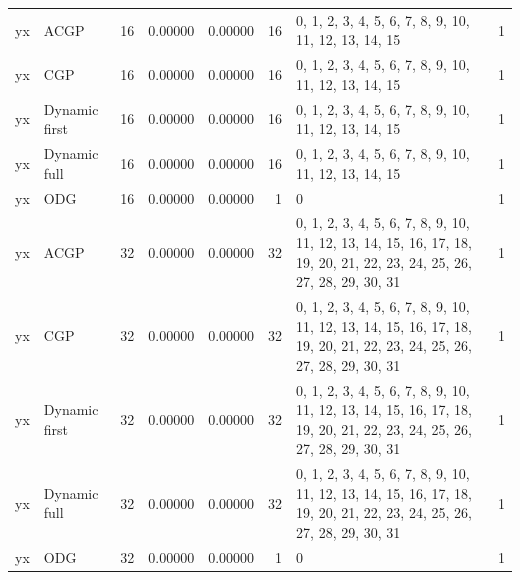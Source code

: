 \documentclass[10pt,a4paper]{article}
\begin{document}
\begin{longtable}{@{}p{23mm}p{29mm}rrrrp{36mm}r@{}}
yx & ACGP & 16 & 0.00000 & 0.00000 & 16 & 0, 1, 2, 3, 4, 5, 6, 7, 8, 9, 10, 11, 12, 13, 14, 15 & 1 \\
yx & CGP & 16 & 0.00000 & 0.00000 & 16 & 0, 1, 2, 3, 4, 5, 6, 7, 8, 9, 10, 11, 12, 13, 14, 15 & 1 \\
yx & Dynamic first & 16 & 0.00000 & 0.00000 & 16 & 0, 1, 2, 3, 4, 5, 6, 7, 8, 9, 10, 11, 12, 13, 14, 15 & 1 \\
yx & Dynamic full & 16 & 0.00000 & 0.00000 & 16 & 0, 1, 2, 3, 4, 5, 6, 7, 8, 9, 10, 11, 12, 13, 14, 15 & 1 \\
yx & ODG & 16 & 0.00000 & 0.00000 & 1 & 0 & 1 \\
yx & ACGP & 32 & 0.00000 & 0.00000 & 32 & 0, 1, 2, 3, 4, 5, 6, 7, 8, 9, 10, 11, 12, 13, 14, 15, 16, 17, 18, 19, 20, 21, 22, 23, 24, 25, 26, 27, 28, 29, 30, 31 & 1 \\
yx & CGP & 32 & 0.00000 & 0.00000 & 32 & 0, 1, 2, 3, 4, 5, 6, 7, 8, 9, 10, 11, 12, 13, 14, 15, 16, 17, 18, 19, 20, 21, 22, 23, 24, 25, 26, 27, 28, 29, 30, 31 & 1 \\
yx & Dynamic first & 32 & 0.00000 & 0.00000 & 32 & 0, 1, 2, 3, 4, 5, 6, 7, 8, 9, 10, 11, 12, 13, 14, 15, 16, 17, 18, 19, 20, 21, 22, 23, 24, 25, 26, 27, 28, 29, 30, 31 & 1 \\
yx & Dynamic full & 32 & 0.00000 & 0.00000 & 32 & 0, 1, 2, 3, 4, 5, 6, 7, 8, 9, 10, 11, 12, 13, 14, 15, 16, 17, 18, 19, 20, 21, 22, 23, 24, 25, 26, 27, 28, 29, 30, 31 & 1 \\
yx & ODG & 32 & 0.00000 & 0.00000 & 1 & 0 & 1 \\
\end{longtable}\normalsize\setlength{\tabcolsep}{6pt}
\clearpage
\end{document}
